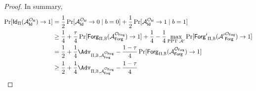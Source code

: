 \begin{proof}
In summary,
\begin{equation*}
	\begin{aligned}
		\Pr[{\sf Id}_{\Pi}(\mathcal{A}_{\sf Id}^{\mathcal{O}_{\sf Id}}) \to 1] 
		&= \frac{1}{2} \Pr[\mathcal{A}_{\sf Id}^{\mathcal{O}_{\sf Id}} \to 0 \mid b = 0] + \frac{1}{2} \Pr[\mathcal{A}_{\sf Id}^{\mathcal{O}_{\sf Id}} \to 1 \mid b = 1] \\
		&\geq \frac{1}{4} + \frac{\tau}{4} \Pr[{\sf Forg}_{\Pi, \mathbb{B}}(\mathcal{A}_{\sf Forg}^{\mathcal{O}_{\sf Forg} }) \to 1 ] + \frac{1}{4} - \frac{1}{4}\max_{\text{PPT } \mathcal{A}'} \Pr[{\sf Forg'}_{\Pi, \mathbb{B}}(\mathcal{A'}_{\sf Forg}^{\mathcal{O}_{\sf Forg} }) \to 1 ] \\
		&= \frac{1}{2} + \frac{1}{4}\Adv_{\Pi, \mathbb{B}, \mathcal{A}_{\sf Forg}^{\mathcal{O}_{\sf Forg}}}  - \frac{1-\tau}{4}\Pr[{\sf Forg}_{\Pi, \mathbb{B}}(\mathcal{A}_{\sf Forg}^{\mathcal{O}_{\sf Forg} }) \to 1 ] \\
		&\geq \frac{1}{2} + \frac{1}{4}\Adv_{\Pi, \mathbb{B}, \mathcal{A}_{\sf Forg}^{\mathcal{O}_{\sf Forg}}}  - \frac{1-\tau}{4}
	\end{aligned}
\end{equation*}

\end{proof}



